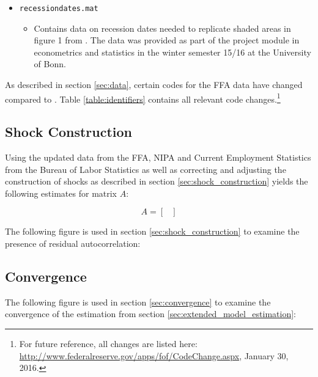 \begin{itemize}
\item \texttt{recessiondates.mat}
	\begin{itemize}
		\item Contains data on recession dates needed to replicate shaded areas in figure 1 from \cite{JERMANNfinancial}. The data was provided as part of the project module in econometrics and statistics in the winter semester 15/16 at the University of Bonn.
	\end{itemize}

\end{itemize}

As described in section \ref{sec:data}, certain codes for the FFA data have changed compared to \citeauthor{JERMANNfinancial}. Table \ref{table:identifiers} contains all relevant code changes.\footnote{For future reference, all changes are listed here: \href{http://www.federalreserve.gov/apps/fof/CodeChange.aspx}{http://www.federalreserve.gov/apps/fof/CodeChange.aspx}, January 30, 2016.} 




\subsection{Shock Construction}
\label{sec:appendix_shock_construction}

Using the updated data from the FFA, NIPA and Current Employment Statistics from the Bureau of Labor Statistics as well as correcting and adjusting the construction of shocks as described in section \ref{sec:shock_construction} yields the following estimates for matrix $A$:
\begin{center}
\[
    A=
      \begin{bmatrix}
    	
      \end{bmatrix}
\]
\end{center}

The following figure is used in section \ref{sec:shock_construction} to examine the presence of residual autocorrelation:




\subsection{Convergence}
\label{sec:appendix_convergence}

The following figure is used in section \ref{sec:convergence} to examine the convergence of the estimation from section \ref{sec:extended_model_estimation}:


